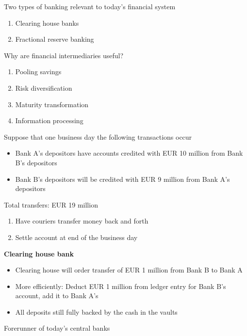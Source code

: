 \documentclass{beamer}
\begin{document}
\begin{frame}
 Two types of banking relevant to today's financial system
\begin{enumerate}
  \item Clearing house banks
  \item Fractional reserve banking
\end{enumerate}
\end{frame}

\begin{frame}
 Why are financial intermediaries useful?
\begin{enumerate}
  \item Pooling savings  
  \item Risk diversification
  \item Maturity transformation
  \item Information processing  
\end{enumerate}
\end{frame}

\begin{frame}
  Suppose that one business day the following transactions occur
\begin{itemize}
  \item Bank A's depositors have accounts credited with EUR 10 million from Bank B's depositors
  \item Bank B's depositors will be credited with EUR 9 million from Bank A's depositors
\end{itemize}
 \medskip
 Total transfers: EUR 19 million\\
 \begin{enumerate}
   \item Have couriers transfer money back and forth
   \item Settle account at end of the business day
 \end{enumerate}
\end{frame}

\begin{frame}
  \textbf{Clearing house bank}
  \begin{itemize}
  \item Clearing house will order transfer of EUR 1 million from Bank B to Bank A
  \item More efficiently: Deduct EUR 1 million from ledger entry for Bank B's account,  add it to Bank A's
  \item All deposits still fully backed by the cash in the vaults
\end{itemize}
\medskip
Forerunner of today's central banks
\end{frame}
\end{document}
